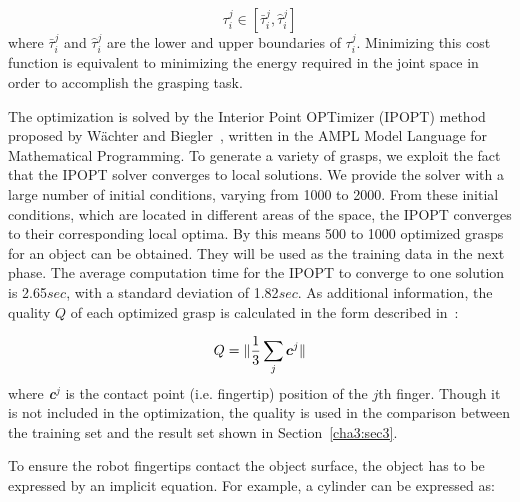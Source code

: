\begin{equation}
 {\tau}^j_i \in [\bar{\tau}^j_i, \hat{\tau}^j_i]
 \label{quality}
\end{equation}
where $\bar{\tau}^j_i$ and $\hat{\tau}^j_i$ are the lower and upper boundaries of $\tau^j_i$.
Minimizing this cost function is equivalent to minimizing the energy required in the joint space in order to accomplish the grasping task.

The optimization is solved by the Interior Point OPTimizer (IPOPT) method proposed by W\"{a}chter and Biegler~\citep{wachter2006implementation}, written in the AMPL Model Language for Mathematical Programming. To generate a variety of grasps, we exploit the fact that the IPOPT solver converges to local solutions. We provide the solver with a large number of initial conditions, varying from 1000 to 2000. From these initial conditions, which are located in different areas of the space, the IPOPT converges to their corresponding local optima. By this means 500 to 1000 optimized grasps for an object can be obtained. They will be used as the training data in the next phase. The average computation time for the IPOPT to converge to one solution is 2.65$sec$, with a standard deviation of 1.82$sec$. As additional information, the quality $Q$ of each optimized grasp is calculated in the form described in~\citep{ponce1997computing}:

\begin{equation}
Q =\Arrowvert \frac{1}{3}\sum_{j} {\boldsymbol{c}^j}\Arrowvert
\vspace{-0.1in}
\end{equation}
where \textbf{\emph{c}}$^j$ is the contact point (i.e. fingertip) position of the $j$th finger. Though it is not included in the optimization, the quality is used in the comparison between the training set and the result set shown in Section~\ref{cha3:sec3}.



To ensure the robot fingertips contact the object surface, the object has to be expressed by an implicit equation. For example, a cylinder can be expressed as:

